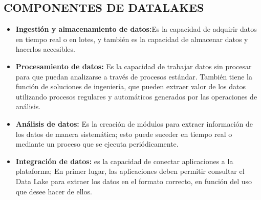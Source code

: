 \documentclass[%
 reprint,
 amsmath,amssymb,
 aps,
]{revtex4-1}
\begin{document}
\subsection{COMPONENTES DE DATALAKES}

\begin{itemize}
	\item \textbf{ Ingestión y almacenamiento de datos:}Es la capacidad de adquirir datos en tiempo real o en lotes, y también es la capacidad de almacenar datos y hacerlos accesibles.
	\item  \textbf{Procesamiento de datos:} Es la capacidad de trabajar datos sin procesar para que puedan analizarse a través de procesos estándar. 
También tiene la función de soluciones de ingeniería, que pueden extraer valor de los datos utilizando procesos regulares y automáticos generados por las operaciones de análisis.
	\item  \textbf{ Análisis de datos:} Es la creación de módulos para extraer información de los datos de manera sistemática; esto puede suceder en tiempo real o mediante un proceso que se ejecuta periódicamente.
	\item  \textbf{Integración de datos:} es la capacidad de conectar aplicaciones a la plataforma; En primer lugar, las aplicaciones deben permitir consultar el Data Lake para extraer los datos en el formato correcto, en función del uso que desee hacer de ellos.
\end{itemize}

\end{document}

